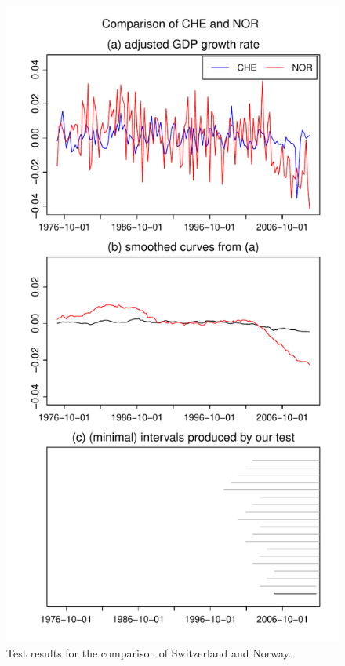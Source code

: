 \documentclass[a4paper,12pt]{article}
\begin{document}
\begin{figure}[p!]
\begin{minipage}[t]{0.49\textwidth}
\includegraphics[width=\textwidth]{Plots/CHE_vs_NOR}
\caption{Test results for the comparison of Switzerland and Norway.}\label{fig:Switzerland:Norway}
\end{minipage}
\hspace{0.25cm}

\end{figure}
\end{document}
